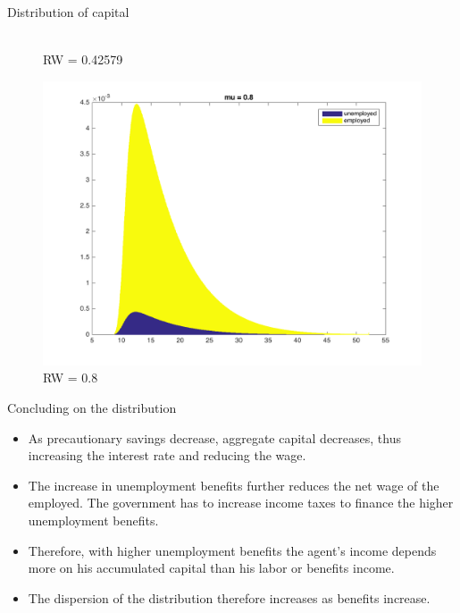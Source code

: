 \documentclass{beamer}
\begin{document}
\begin{frame}{Distribution of capital}
\begin{figure}[!tbp]
\begin{minipage}[b]{0.32\textwidth}
    	\\RW = 0.42579
  \end{minipage}
  \hfill
  \begin{minipage}[b]{0.32\textwidth}
    \includegraphics[width=\textwidth]{distribution3}
   	 \\RW = 0.8
  \end{minipage}
\end{figure}
\end{frame}


\begin{frame}{Concluding on the distribution}

\begin{itemize} 


	\item {
As precautionary savings decrease, aggregate capital decreases, thus increasing the interest rate and reducing the wage. 
}
	\item {
The increase in unemployment benefits further reduces the net wage of the employed. The government has to increase income taxes to finance the higher unemployment benefits.
}
	\item {
Therefore, with higher unemployment benefits the agent's income depends more on his accumulated capital than his labor or benefits income. 
}
	\item {
The dispersion of the distribution therefore increases as benefits increase.
}


\end{itemize}

\end{frame}
\end{document}
